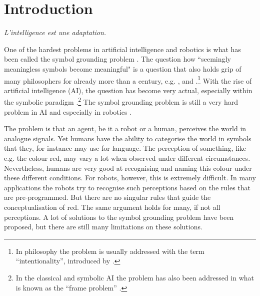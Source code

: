 \chapter{Introduction}\label{ch:intro}

\epigraph{\itshape L'intelligence est une adaptation.\\[-2\baselineskip]}{\citep{piaget:1966}}

\noindent One of the hardest problems in artificial intelligence and robotics is what has been called the {\sc symbol grounding problem} \citep{harnad:1990}. The question how ``seemingly meaningless symbols become meaningful" \citep{harnad:1990} is a question that also holds grip of many philosophers for already more than a century, e.g. \citet{bretano:1874}, \citet{searle:1980} and \citet{dennett:1991}.\footnote{In philosophy the problem is usually addressed with the term ``intentionality'', introduced by \citet{bretano:1874}.} With the rise of artificial intelligence (AI), the question has become very actual, especially within the symbolic paradigm \citep{newell:1990}.\footnote{In the classical and symbolic AI the problem has also been addressed in what is known as the ``frame problem'' \citep{pylyshyn:1987}.} The symbol grounding problem is still a very hard problem in AI and especially in robotics \citep{pfeiferscheier:1999}.

The problem is that an agent, be it a robot or a human, perceives the world in analogue signals. Yet humans have the ability to categorise the world in symbols that they, for instance may use for language. The perception of something, like e.g. the colour red, may vary a lot when observed under different circumstances. Nevertheless, humans are very good at recognising and naming this colour under these different conditions. For robots, however, this is extremely difficult. In many applications the robots try to recognise such perceptions based on the rules that are pre-programmed. But there are no singular rules that guide the conceptualisation of red. The same argument holds for many, if not all perceptions. A lot of solutions to the symbol grounding problem have been proposed, but there are still many limitations on these solutions. 

